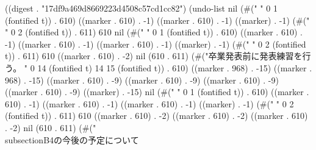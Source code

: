 
((digest . "17df9a469d8669223d4508c57cd1cc82") (undo-list nil (#("
" 0 1 (fontified t)) . 610) ((marker . 610) . -1) ((marker . 610) . -1) ((marker) . -1) (#("  " 0 2 (fontified t)) . 611) 610 nil (#("
" 0 1 (fontified t)) . 610) ((marker . 610) . -1) ((marker . 610) . -1) ((marker . 610) . -1) ((marker) . -1) (#("  " 0 2 (fontified t)) . 611) 610 ((marker . 610) . -2) nil (610 . 611) (#("卒業発表前に発表練習を行う。
" 0 14 (fontified t) 14 15 (fontified t)) . 610) ((marker . 968) . -15) ((marker . 968) . -15) ((marker . 610) . -9) ((marker . 610) . -9) ((marker . 610) . -9) ((marker . 610) . -9) ((marker) . -15) nil (#("
" 0 1 (fontified t)) . 610) ((marker . 610) . -1) ((marker . 610) . -1) ((marker . 610) . -1) ((marker) . -1) (#("  " 0 2 (fontified t)) . 611) 610 ((marker . 610) . -2) ((marker . 610) . -2) ((marker . 610) . -2) nil (610 . 611) (#("\\subsection{B4の今後の予定について}
